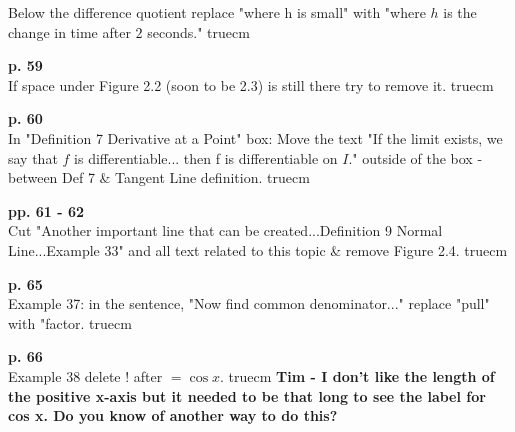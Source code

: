 \documentclass[11pt]{report}
\begin{document}
Below the difference quotient replace "where h is small" with "where $h$ is the change in time after $2$ seconds."
 truecm

\textbf{p. 59} \\ 
If space under Figure 2.2 (soon to be 2.3) is still there try to remove it. truecm

\textbf{p. 60} \\ 
In "Definition 7 Derivative at a Point" box:
Move the text "If the limit exists, we say that $f$ is differentiable... then f is differentiable on $I$." outside of the box - between Def 7 \& Tangent Line definition.
  truecm

\textbf{pp. 61 - 62} \\ 
Cut "Another important line that can be created...Definition 9 Normal Line...Example 33" and all text related to this topic \& remove Figure 2.4. 
 truecm

\textbf{p. 65} \\ 
Example 37: in the sentence, "Now find common denominator..." replace "pull" with "factor.
 truecm

\textbf{p. 66} \\ 
Example 38 delete ! after $=\cos x$.  truecm
\textbf{Tim - I don't like the length of the positive x-axis but it needed to be that long to see the label for cos x. Do you know of another way to do this?}\\
\end{document}
